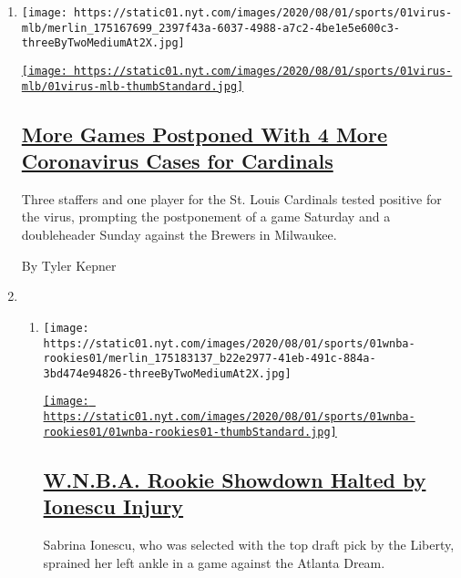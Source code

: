\begin{enumerate}
\def\labelenumi{\arabic{enumi}.}
\item
  \texttt{[image: https://static01.nyt.com/images/2020/08/01/sports/01virus-mlb/merlin\_175167699\_2397f43a-6037-4988-a7c2-4be1e5e600c3-threeByTwoMediumAt2X.jpg]}

  \href{/2020/08/01/sports/baseball/coronavirus-cardinals.html}{\texttt{[image: https://static01.nyt.com/images/2020/08/01/sports/01virus-mlb/01virus-mlb-thumbStandard.jpg]}}

  \hypertarget{more-games-postponed-with-4-more-coronavirus-cases-for-cardinals}{%
  \subsection{\texorpdfstring{\href{/2020/08/01/sports/baseball/coronavirus-cardinals.html}{More
  Games Postponed With 4 More Coronavirus Cases for
  Cardinals}}{More Games Postponed With 4 More Coronavirus Cases for Cardinals}}\label{more-games-postponed-with-4-more-coronavirus-cases-for-cardinals}}

  Three staffers and one player for the St. Louis Cardinals tested
  positive for the virus, prompting the postponement of a game Saturday
  and a doubleheader Sunday against the Brewers in Milwaukee.

  By Tyler Kepner
\item
  \begin{enumerate}
  \def\labelenumii{\arabic{enumii}.}
  \item
    \texttt{[image: https://static01.nyt.com/images/2020/08/01/sports/01wnba-rookies01/merlin\_175183137\_b22e2977-41eb-491c-884a-3bd474e94826-threeByTwoMediumAt2X.jpg]}

    \href{/2020/08/01/sports/basketball/sabrina-ionescu-injury.html}{\texttt{[image: https://static01.nyt.com/images/2020/08/01/sports/01wnba-rookies01/01wnba-rookies01-thumbStandard.jpg]}}

    \hypertarget{wnba-rookie-showdown-halted-by-ionescu-injury}{%
    \subsection{\texorpdfstring{\href{/2020/08/01/sports/basketball/sabrina-ionescu-injury.html}{W.N.B.A.
    Rookie Showdown Halted by Ionescu
    Injury}}{W.N.B.A. Rookie Showdown Halted by Ionescu Injury}}\label{wnba-rookie-showdown-halted-by-ionescu-injury}}

    Sabrina Ionescu, who was selected with the top draft pick by the
    Liberty, sprained her left ankle in a game against the Atlanta
    Dream.


\end{enumerate}
\end{enumerate}
